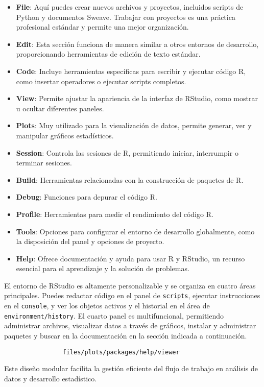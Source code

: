 \documentclass[12pt]{report}\usepackage[]{graphicx}\usepackage[dvipsnames]{xcolor}
\begin{document}
			\begin{itemize}
				
				\item \textbf{File}: Aquí puedes crear nuevos archivos y proyectos, incluidos scripts de Python y documentos Sweave. Trabajar con proyectos es una práctica profesional estándar y permite una mejor organización.
				
				\item \textbf{Edit}: Esta sección funciona de manera similar a otros entornos de desarrollo, proporcionando herramientas de edición de texto estándar.
				
				\item \textbf{Code}: Incluye herramientas específicas para escribir y ejecutar código R, como insertar operadores o ejecutar scripts completos.
				
				\item \textbf{View}: Permite ajustar la apariencia de la interfaz de RStudio, como mostrar u ocultar diferentes paneles.
				
				\item \textbf{Plots}: Muy utilizado para la visualización de datos, permite generar, ver y manipular gráficos estadísticos.
				
				\item \textbf{Session}: Controla las sesiones de R, permitiendo iniciar, interrumpir o terminar sesiones.
				
				\item \textbf{Build}: Herramientas relacionadas con la construcción de paquetes de R.
				
				\item \textbf{Debug}: Funciones para depurar el código R.
				
				\item \textbf{Profile}: Herramientas para medir el rendimiento del código R.
				
				\item \textbf{Tools}: Opciones para configurar el entorno de desarrollo globalmente, como la disposición del panel y opciones de proyecto.
				
				\item \textbf{Help}: Ofrece documentación y ayuda para usar R y RStudio, un recurso esencial para el aprendizaje y la solución de problemas.
				
			\end{itemize}
			
			El entorno de RStudio es altamente personalizable y se organiza en cuatro áreas principales. Puedes redactar código en el panel de \texttt{scripts}, ejecutar instrucciones en el \texttt{console}, y ver los objetos activos y el historial en el área de \texttt{environment/history}. El cuarto panel es multifuncional, permitiendo administrar archivos, visualizar datos a través de gráficos, instalar y administrar paquetes y buscar en la documentación en la sección indicada a continuación. 
			\begin{verbatim}
				files/plots/packages/help/viewer
			\end{verbatim}
			Este diseño modular facilita la gestión eficiente del flujo de trabajo en análisis de datos y desarrollo estadístico.
			
\end{document}
